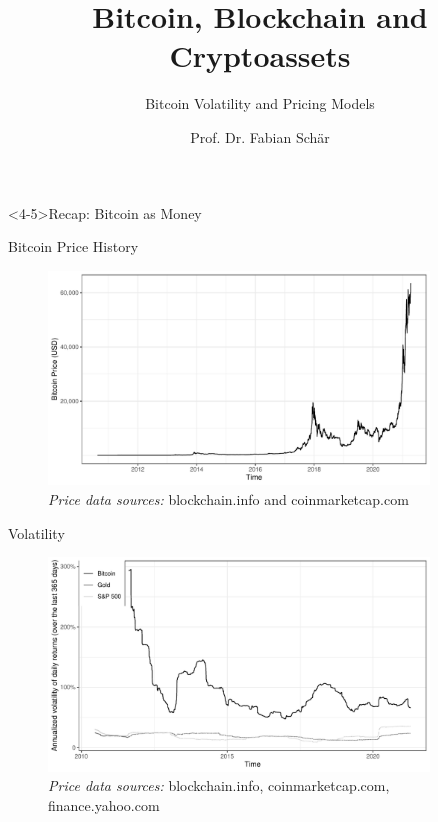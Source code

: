 \documentclass[]{beamer}
\title{Bitcoin, Blockchain and Cryptoassets}
\subtitle{Bitcoin Volatility and Pricing Models}
\author{Prof. Dr. Fabian Schär}
\institute{University of Basel}
\begin{document}
\thispagestyle{empty}
\begin{frame}[noframenumbering]
	\titlepage
\end{frame}

\begin{frame}<4-5>{Recap: Bitcoin as Money}
	\begin{figure}
		
	\end{figure}
\end{frame}

\begin{frame}{Bitcoin Price History}
	\begin{figure}
		\includegraphics[width = 0.9\textwidth]{../assets/figures/price_graph}	
		\caption*{\textit{Price data sources:} blockchain.info and coinmarketcap.com}
	\end{figure}
\end{frame}

\begin{frame}{Volatility}
	\begin{figure}
		\includegraphics[width = 0.9\textwidth]{../assets/figures/volatility_all.pdf}
		\caption*{\textit{Price data sources:} blockchain.info, coinmarketcap.com, finance.yahoo.com}
	\end{figure}
\end{frame}
\end{document}
